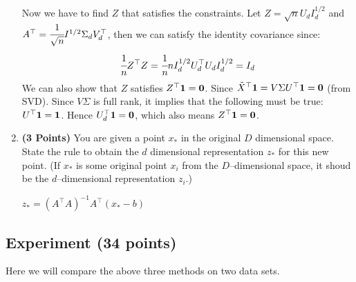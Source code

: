 \documentclass[a4paper]{article}
\newcommand*{\zero}{{\bf 0}}
\newcommand*{\one}{{\bf 1}}
\theoremstyle{definition}
\newenvironment{soln}{
    \leavevmode\color{blue}\ignorespaces
}{}
\begin{document}
\begin{enumerate}
\begin{soln}
    Now we have to find $Z$ that satisfies the constraints. Let $Z = \sqrt{n}U_d I_d^{1/2}$ and $A^\top = \cfrac{1}{\sqrt{n}}I^{1/2}\Sigma_d V_d^\top$, then we can satisfy the identity covariance since: \\
    \begin{equation*}
        \cfrac{1}{n}Z^\top Z = \cfrac{1}{n}nI_d^{1/2} U_d^\top U_d I_d^{1/2} = I_d
    \end{equation*}
    We can also show that $Z$ satisfies $Z^\top \one = \zero$. Since $\tilde{X}^\top \one = V\Sigma U^\top \one = \zero$ (from SVD). Since $V\Sigma$ is full rank, it implies that the following must be true: $U^\top \one = \one$. Hence $U_d^\top \one = \zero$, which also means $Z^\top \one = \zero$.
\end{soln}

\item \textbf{(3 Points)}
You are given a point $x_*$ in the original $D$ dimensional space.
State the rule to obtain the $d$ dimensional
representation $z_*$ for this new point.
(If $x_*$ is some original point $x_i$ from the $D$--dimensional space, it shoud be the
$d$--dimensional representation $z_i$.)

\begin{soln}
    $z_* = (A^\top A)^{-1}A^\top (x_*-b)$
\end{soln}

\end{enumerate}

\newpage
\subsection{Experiment (34 points)}

Here we will compare the above three methods on two data sets. 
\end{document}
